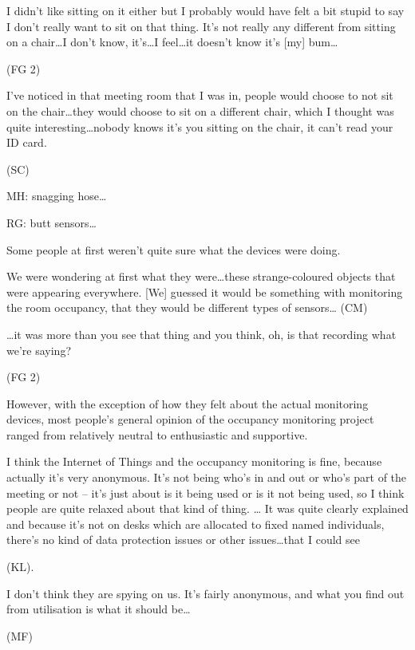 \begin{qt}I didn’t like sitting on it either but I probably would have felt a
bit stupid to say I don’t really want to sit on that thing. It’s not
really any different from sitting on a chair\ldots I don’t know,
it’s\ldots I feel\ldots it doesn’t know it’s [my] bum\ldots\end{qt} (FG 2)

\begin{qt}I’ve noticed in that meeting room that I was in, people would choose
to not sit on the chair\ldots they would choose to sit on a different
chair, which I thought was quite interesting\ldots nobody knows it’s you
sitting on the chair, it can’t read your ID card.\end{qt} (SC)

MH: snagging hose…

RG: butt sensors\ldots

Some people at first weren’t quite sure what the devices were doing.
\begin{qt}We were wondering at first what they were\ldots these strange-coloured
objects that were appearing everywhere. [We] guessed it would be
something with monitoring the room occupancy, that they would be
different types of sensors… (CM)\end{qt}

\begin{qt}\ldots it was more than you see that thing and you think, oh, is that
recording what we’re saying?\end{qt} (FG 2) 

However, with the exception of how they felt about the actual
monitoring devices, most people’s general opinion of the occupancy
monitoring project ranged from relatively neutral to enthusiastic and
supportive.

\begin{qt}I think the Internet of Things and the occupancy monitoring is fine,
because actually it’s very anonymous. It’s not being who’s in and out
or who’s part of the meeting or not – it’s just about is it being used
or is it not being used, so I think people are quite relaxed about
that kind of thing. … It was quite clearly explained and because it’s
not on desks which are allocated to fixed named individuals, there’s
no kind of data protection issues or other issues\ldots that I could see\end{qt}
(KL).

\begin{qt}I don’t think they are spying on us. It’s fairly anonymous, and what
you find out from utilisation is what it should be…\end{qt} (MF)


